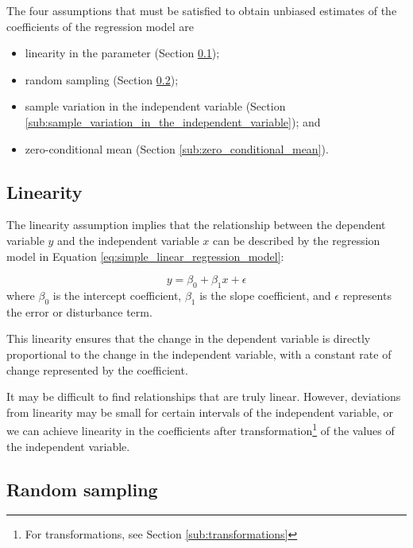\bigskip
The four assumptions that must be satisfied to obtain unbiased estimates of the coefficients of the regression model are

\begin{itemize}
\item linearity in the parameter (Section \ref{sub:linearity});
\item random sampling (Section \ref{sub:random_sampling});
\item sample variation in the independent variable (Section \ref{sub:sample_variation_in_the_independent_variable}); and
\item zero-conditional mean (Section \ref{sub:zero_conditional_mean}).
\end{itemize}

\subsection{Linearity} %
\label{sub:linearity}

The linearity assumption implies that the relationship between the dependent variable $y$ and the independent variable $x$ can be described by the regression model in Equation \ref{eq:simple_linear_regression_model}:

\begin{equation*}
y = \beta_0 + \beta_1x + \epsilon
\end{equation*}
where $\beta_0$ is the intercept coefficient, $\beta_1$ is the slope coefficient, and $\epsilon$ represents the error or disturbance term.

This linearity ensures that the change in the dependent variable is directly proportional to the change in the independent variable, with a constant rate of change represented by the coefficient. 

It may be difficult to find relationships that are truly linear. However, deviations from linearity may be small for certain intervals of the independent variable, or we can achieve linearity in the coefficients after transformation\footnote{For transformations, see Section \ref{sub:transformations}} of the values of the independent variable.
 


\subsection{Random sampling} %
\label{sub:random_sampling}

